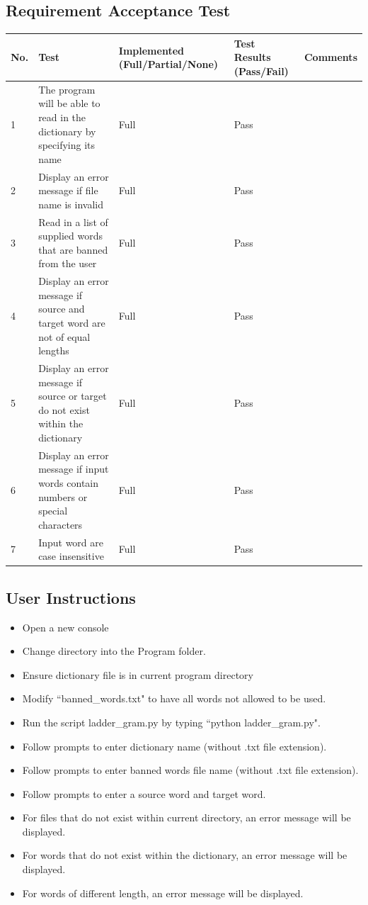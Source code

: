 \documentclass[12pt, a4]{report}
\begin{document}
	\subsection{Requirement Acceptance Test}
	
		\begin{tabular}{ |p{0.5cm}|p{7.25cm}|p{2.5cm}|p{2.5cm}|p{2cm}| }
			\hline
			No. & Test & Implemented (Full/Partial/None) & Test Results (Pass/Fail) & Comments \\
			\hline
			1 & The program will be able to read in the dictionary by specifying its name & Full & Pass &  \\
			2 & Display an error message if file name is invalid & Full & Pass  & \\
			3 & Read in a list of supplied words that are banned from the user & Full & Pass & \\
			4 & Display an error message if source and target word are not of equal lengths & Full & Pass & \\
			5 & Display an error message if source or target do not exist within the dictionary & Full & Pass & \\
			6 & Display an error message if input words contain numbers or special characters & Full & Pass & \\
			7 & Input word are case insensitive & Full & Pass & \\
			\hline
		\end{tabular}
	
	\pagebreak
	\subsection{User Instructions}
		\begin{itemize}
			\item Open a new console 
			\item Change directory into the Program folder.
			\item Ensure dictionary file is in current program directory
			\item Modify ``banned\_words.txt" to have all words not allowed to be used.  
			\item Run the script ladder\_gram.py by typing ``python ladder\_gram.py".
			\item Follow prompts to enter dictionary name (without .txt file extension).
			\item Follow prompts to enter banned words file name (without .txt file extension).
			\item Follow prompts to enter a source word and target word.
			\item For files that do not exist within current directory, an error message will be displayed.
			\item For words that do not exist within the dictionary, an error message will be displayed. 
			\item For words of different length, an error message will be displayed. 
		\end{itemize}


	
\end{document}
